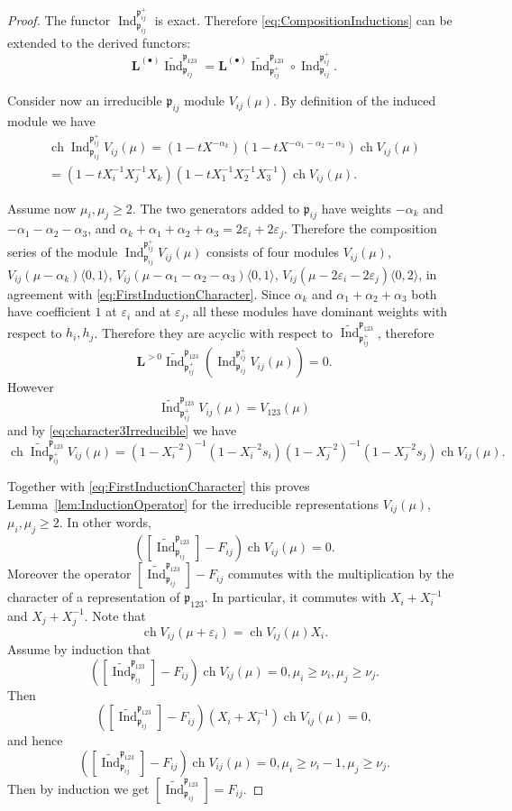\documentclass[10pt]{amsart}
\newcommand{\sh}[2]{\langle #1,#2\rangle}
\newcommand{\fp}{{\mathfrak p}}
\newcommand{\LInd}{\mathbf{L}^{(\bullet)}\widetilde{\Ind}}
\DeclareMathOperator{\Ind}{Ind}
\DeclareMathOperator{\ch}{ch}
\begin{document}
\begin{proof}
		The functor $ \Ind^{{\fp_{ij}^+}}_{\fp_{ij}}$ is exact. Therefore \eqref{eq:CompositionInductions} can be extended to the derived functors:
		\begin{equation*}\label{eq:DerivedCompositionInductions}
			\LInd_{\fp_{ij}}^{\fp_{123}}= \LInd_{\fp_{ij}^+}^{\fp_{123}}\circ \Ind^{{\fp_{ij}^+}}_{\fp_{ij}}.
		\end{equation*}
		
		Consider now an irreducible $\fp_{ij}$ module $V_{ij}(\mu)$. By definition of the induced module we have
		\begin{multline}\label{eq:FirstInductionCharacter}
			\ch  \Ind^{{\fp_{ij}^+}}_{\fp_{ij}}V_{ij}(\mu)= (1-tX^{-\alpha_k})(1-tX^{-\alpha_1-\alpha_2-\alpha_3})\ch V_{ij}(\mu)\\=(1-tX_i^{-1}X_j^{-1}X_k)(1-tX_1^{-1}X_2^{-1}X_3^{-1})\ch  V_{ij}(\mu).
		\end{multline}
		
		Assume now $\mu_i, \mu_j \geq 2$. The two generators added to $\fp_{ij}$ have weights $-\alpha_k$ and $-\alpha_1-\alpha_2-\alpha_3$, and $\alpha_k+\alpha_1+\alpha_2+\alpha_3=2\varepsilon_i+2\varepsilon_j$. Therefore the composition series of the module $\Ind^{{\fp_{ij}^+}}_{\fp_{ij}}V_{ij}(\mu)$ consists of four modules $V_{ij}(\mu)$, $V_{ij}(\mu-\alpha_k)\sh{0}{1}$, $V_{ij}(\mu- \alpha_1-\alpha_2-\alpha_3)\sh{0}{1}$, $V_{ij}(\mu-2\varepsilon_i-2\varepsilon_j)\sh{0}{2}$, in agreement with \eqref{eq:FirstInductionCharacter}. Since $\alpha_k$ and $\alpha_1+\alpha_2+\alpha_3$ both have coefficient $1$ at $\varepsilon_i$ and at $\varepsilon_j$, all these modules have dominant weights with respect to $h_i, h_j$. Therefore they are acyclic with respect to $\widetilde{\Ind}_{\fp_{ij}^+}^{\fp_{123}}$, therefore 
		\[\mathbf{L}^{>0}\widetilde{\Ind}_{\fp_{ij}^+}^{\fp_{123}}(\Ind^{{\fp_{ij}^+}}_{\fp_{ij}}V_{ij}(\mu))=0.\]
		However
		\[\widetilde{\Ind}_{\fp_{ij}^+}^{\fp_{123}}V_{ij}(\mu)=V_{123}(\mu)\]
		and by \eqref{eq:character3Irreducible} we have
		\[\ch \widetilde{\Ind}_{\fp_{ij}^+}^{\fp_{123}}V_{ij}(\mu)=(1-X_{i}^{-2})^{-1}(1-X_{i}^{-2}s_i)(1-X_{j}^{-2})^{-1}(1-X_{j}^{-2}s_j)\ch V_{ij}(\mu).\]
		
		Together with \eqref{eq:FirstInductionCharacter} this proves Lemma~\ref{lem:InductionOperator} for the irreducible representations $V_{ij}(\mu)$, $\mu_i,\mu_j \geq 2$. In other words,
		\[([\widetilde{\Ind}_{\fp_{ij}}^{\fp_{123}}]-F_{ij})\ch V_{ij}(\mu)=0.\]
		Moreover the operator $[\widetilde{\Ind}_{\fp_{ij}}^{\fp_{123}}]-F_{ij}$ commutes with the multiplication by the character of a representation of $\fp_{123}$. In particular, it commutes with $X_i+X_i^{-1}$ and $X_j+X_j^{-1}$. Note that 
		\[\ch V_{ij}(\mu+ \varepsilon_i)=\ch V_{ij}(\mu)X_i.\]
		Assume by induction that 
		\[([\widetilde{\Ind}_{\fp_{ij}}^{\fp_{123}}]-F_{ij})\ch V_{ij}(\mu)=0, \mu_i \geq \nu_i, \mu_j \geq \nu_j.\]
		Then 
		\[([\widetilde{\Ind}_{\fp_{ij}}^{\fp_{123}}]-F_{ij})(X_i+X_i^{-1})\ch V_{ij}(\mu)=0,\]
		and hence 
		\[([\widetilde{\Ind}_{\fp_{ij}}^{\fp_{123}}]-F_{ij})\ch V_{ij}(\mu)=0, \mu_i \geq \nu_i-1, \mu_j \geq \nu_j.\]
		Then by induction we get $[\widetilde{\Ind}_{\fp_{ij}}^{\fp_{123}}]=F_{ij}$.
	\end{proof}
	
\end{document}
